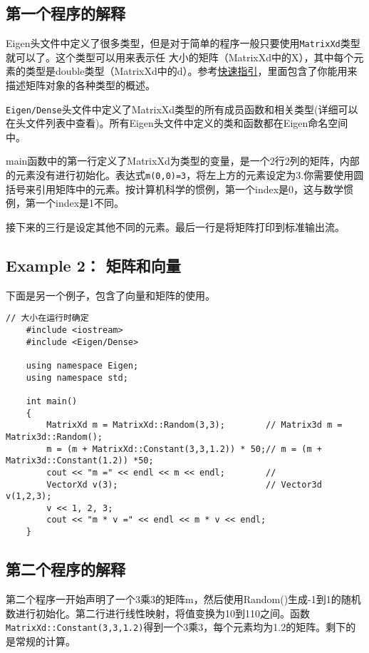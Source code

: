\subsection{第一个程序的解释}
Eigen头文件中定义了很多类型，但是对于简单的程序一般只要使用\verb|MatrixXd|类型就可以了。这个类型可以用来表示任 大小的矩阵（MatrixXd中的X），其中每个元素的类型是double类型（MatrixXd中的d）。参考\href{https://eigen.tuxfamily.org/dox/group__QuickRefPage.html#QuickRef_Types}{快速指引}，里面包含了你能用来描述矩阵对象的各种类型的概述。

\verb|Eigen/Dense|头文件中定义了MatrixXd类型的所有成员函数和相关类型(详细可以在头文件列表中查看)。所有Eigen头文件中定义的类和函数都在Eigen命名空间中。

main函数中的第一行定义了MatrixXd为类型的变量，是一个2行2列的矩阵，内部的元素没有进行初始化。表达式\verb|m(0,0)=3|，将左上方的元素设定为3.你需要使用圆括号来引用矩阵中的元素。按计算机科学的惯例，第一个index是0，这与数学惯例，第一个index是1不同。

接下来的三行是设定其他不同的元素。最后一行是将矩阵打印到标准输出流。

\subsection{Example 2： 矩阵和向量}
下面是另一个例子，包含了向量和矩阵的使用。

\begin{lstlisting}[style=Cpp]
	// 大小在运行时确定
	#include <iostream>
	#include <Eigen/Dense>
	
	using namespace Eigen;
	using namespace std;
	
	int main()
	{
		MatrixXd m = MatrixXd::Random(3,3);        // Matrix3d m = Matrix3d::Random();
		m = (m + MatrixXd::Constant(3,3,1.2)) * 50;// m = (m + Matrix3d::Constant(1.2)) *50;
		cout << "m =" << endl << m << endl;        // 
		VectorXd v(3);                             // Vector3d v(1,2,3);
		v << 1, 2, 3;
		cout << "m * v =" << endl << m * v << endl;
	}
\end{lstlisting}

\subsection{第二个程序的解释}

第二个程序一开始声明了一个3乘3的矩阵m，然后使用Random()生成-1到1的随机数进行初始化。第二行进行线性映射，将值变换为10到110之间。函数\verb|MatrixXd::Constant(3,3,1.2)|得到一个3乘3，每个元素均为1.2的矩阵。剩下的是常规的计算。

